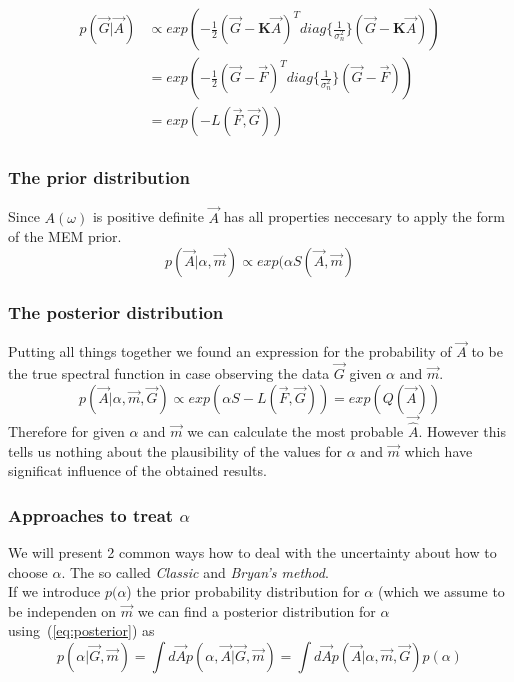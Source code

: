 \begin{align}\label{eq:likelihood function}
 \begin{split}
 p(\vec{G}|\vec{A}) & \propto  exp \left( -\frac{1}{2} (\vec{G}-\textbf{K}\vec{A})^T diag\{ \frac{1}{\sigma_n^2} \} (\vec{G}-\textbf{K}\vec{A})  \right)
 \\
 & = exp \left( -\frac{1}{2} (\vec{G}-\vec{F})^T diag\{ \frac{1}{\sigma_n^2} \} (\vec{G}-\vec{F})  \right)
 \\
 & = exp(- L(\vec{F},\vec{G}))  
 \end{split}
\end{align}

\subsubsection{The prior distribution}

Since $A(\omega)$ is positive definite $\vec{A}$ has all properties neccesary to apply the form of the MEM prior. 
\begin{equation}\label{eq:prior}
 p(\vec{A}|\alpha,\vec{m}) \propto exp(\alpha S(\vec{A},\vec{m})
\end{equation}

\subsubsection{The posterior distribution}

Putting all things together we found an expression for the probability of $\vec{A}$ to be the true spectral function in 
case observing the data $\vec{G}$ given $\alpha$ and $\vec{m}$.
\begin{equation}\label{eq:posterior}
 p(\vec{A}|\alpha,\vec{m},\vec{G}) \propto  exp(\alpha S - L(\vec{F},\vec{G})) = exp(Q(\vec{A}))
\end{equation}
Therefore for given $\alpha$ and $\vec{m}$ we can calculate the most probable $\vec{\hat{A}}$. However this tells us nothing about
the plausibility of the values for $\alpha$ and $\vec{m}$ which have significat influence of the obtained results.

\subsubsection{Approaches to treat $\alpha$}

We will present 2 common ways how to deal with the uncertainty about how to choose $\alpha$. The so called \textit{Classic} 
and \textit{Bryan's method}. 
\\
If we introduce $p(\alpha$) the prior probability distribution for $\alpha$ (which we assume to be independen on $\vec{m}$ 
we can find a posterior distribution for $\alpha$ using~(\ref{eq:posterior}) as
\begin{equation}
 p(\alpha | \vec{G},\vec{m}) = \int d\vec{A} p(\alpha,\vec{A}|\vec{G},\vec{m}) = \int d\vec{A} p(\vec{A}|\alpha,\vec{m},\vec{G})p(\alpha)
\end{equation}

